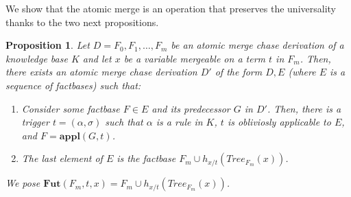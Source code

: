 \documentclass{article}
\newtheorem{proposition}{Proposition}[section]
\theoremstyle{definition}
\theoremstyle{remark}
\newcommand{\Appl}{\textbf{appl}}
\newcommand{\Tree}{\textit{Tree}}
\newcommand{\Fut}{\textbf{Fut}}
\begin{document}
We show that the atomic merge is an operation that preserves the universality thanks to the two next propositions.

\begin{proposition} \label{step1}
Let $D = F_0,F_1,\ldots,F_m$ be an atomic merge chase derivation of a knowledge base $K$
and let $x$ be a variable mergeable on a term $t$ in $F_m$.
Then, there exists an atomic merge chase derivation $D'$ of the form $D, E$ (where $E$ is a sequence of factbases) such that:
\begin{enumerate}
\item Consider some factbase $F \in E$ and its predecessor $G$ in $D'$.
Then, there is a trigger $t = (\alpha, \sigma)$ such that $\alpha$ is a rule in $K$, $t$ is obliviosly applicable to $E$, and $F = \Appl(G, t)$.
\item The last element of $E$ is the factbase $F_m \cup h_{x/t}(\Tree_{F_m}(x))$. 
\end{enumerate}
We pose \emph{$\Fut(F_m,t,x) = F_m \cup h_{x/t}(\Tree_{F_m}(x))$}.
\end{proposition}
\end{document}
